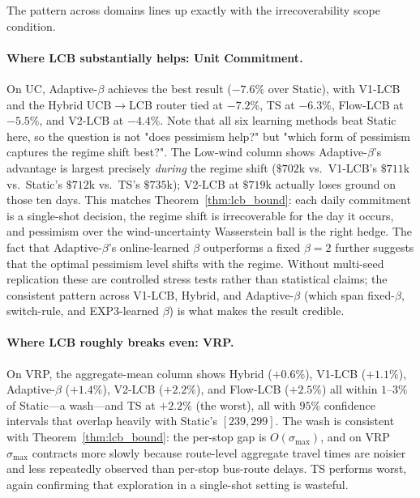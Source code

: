 \documentclass[11pt]{article}
\theoremstyle{definition}
\theoremstyle{remark}
\begin{document}
The pattern across domains lines up exactly with the
irrecoverability scope condition.

\paragraph{Where LCB substantially helps: Unit Commitment.}
On UC, Adaptive-$\beta$ achieves the best result ($-7.6\%$ over
Static), with V1-LCB and the Hybrid UCB$\to$LCB router tied at
$-7.2\%$, TS at $-6.3\%$, Flow-LCB at $-5.5\%$, and V2-LCB at
$-4.4\%$. Note that all six learning methods beat Static here, so
the question is not "does pessimism help?" but "which form of
pessimism captures the regime shift best?". The Low-wind
column shows Adaptive-$\beta$'s advantage is largest precisely
\emph{during} the regime shift ($\$702$k vs.\ V1-LCB's $\$711$k vs.\
Static's $\$712$k vs.\ TS's $\$735$k); V2-LCB at $\$719$k actually
loses ground on those ten days. This matches
Theorem~\ref{thm:lcb_bound}: each daily commitment is a single-shot
decision, the regime shift is irrecoverable for the day it occurs,
and pessimism over the wind-uncertainty Wasserstein ball is the
right hedge. The fact that Adaptive-$\beta$'s online-learned
$\beta$ outperforms a fixed $\beta=2$ further suggests that the
optimal pessimism level shifts with the regime. Without multi-seed
replication these are controlled stress tests rather than
statistical claims; the consistent pattern across V1-LCB, Hybrid,
and Adaptive-$\beta$ (which span fixed-$\beta$, switch-rule, and
EXP3-learned $\beta$) is what makes the result credible.

\paragraph{Where LCB roughly breaks even: VRP.}
On VRP, the aggregate-mean column shows Hybrid ($+0.6\%$),
V1-LCB ($+1.1\%$), Adaptive-$\beta$ ($+1.4\%$), V2-LCB
($+2.2\%$), and Flow-LCB ($+2.5\%$) all within $1$--$3\%$ of
Static---a wash---and TS at $+2.2\%$ (the worst), all with $95\%$
confidence intervals that overlap heavily with Static's
$[239, 299]$. The wash is consistent with
Theorem~\ref{thm:lcb_bound}: the per-stop gap is $O(\sigma_{\max})$,
and on VRP $\sigma_{\max}$ contracts more slowly because route-level
aggregate travel times are noisier and less repeatedly observed than
per-stop bus-route delays. TS performs worst, again confirming that
exploration in a single-shot setting is wasteful.
\end{document}
